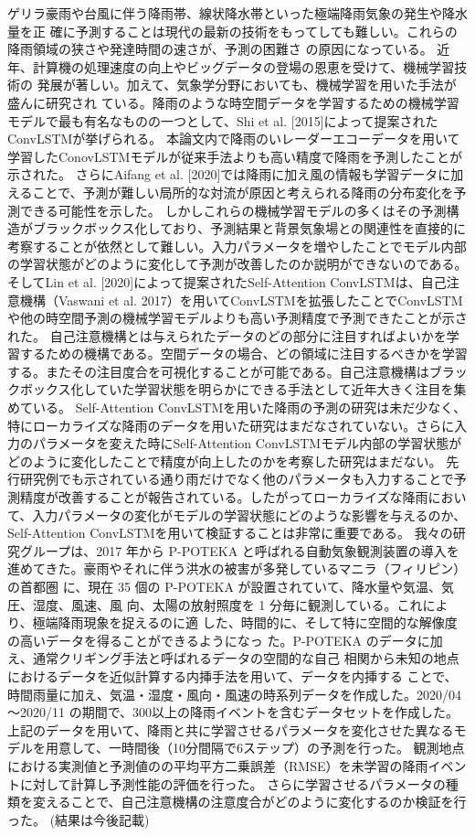 ゲリラ豪雨や台風に伴う降雨帯、線状降水帯といった極端降雨気象の発生や降水量を正
確に予測することは現代の最新の技術をもってしても難しい。これらの降雨領域の狭さや発達時間の速さが、予測の困難さ
の原因になっている。
近年、計算機の処理速度の向上やビッグデータの登場の恩恵を受けて、機械学習技術の
発展が著しい。加えて、気象学分野においても、機械学習を用いた手法が盛んに研究され
ている。降雨のような時空間データを学習するための機械学習モデルで最も有名なものの一つとして、Shi et al. [2015]によって提案されたConvLSTMが挙げられる。
本論文内で降雨のいレーダーエコーデータを用いて学習したConovLSTMモデルが従来手法よりも高い精度で降雨を予測したことが示された。
さらにAifang et al. [2020]では降雨に加え風の情報も学習データに加えることで、予測が難しい局所的な対流が原因と考えられる降雨の分布変化を予測できる可能性を示した。
しかしこれらの機械学習モデルの多くはその予測構造がブラックボックス化しており、予測結果と背景気象場との関連性を直接的に考察することが依然として難しい。入力パラメータを増やしたことでモデル内部の学習状態がどのように変化して予測が改善したのか説明ができないのである。
そしてLin et al. [2020]によって提案されたSelf-Attention ConvLSTMは、自己注意機構（Vaswani et al. 2017）を用いてConvLSTMを拡張したことでConvLSTMや他の時空間予測の機械学習モデルよりも高い予測精度で予測できたことが示された。
自己注意機構とは与えられたデータのどの部分に注目すればよいかを学習するための機構である。空間データの場合、どの領域に注目するべきかを学習する。またその注目度合を可視化することが可能である。自己注意機構はブラックボックス化していた学習状態を明らかにできる手法として近年大きく注目を集めている。
Self-Attention ConvLSTMを用いた降雨の予測の研究は未だ少なく、特にローカライズな降雨のデータを用いた研究はまだなされていない。さらに入力のパラメータを変えた時にSelf-Attention ConvLSTMモデル内部の学習状態がどのように変化したことで精度が向上したのかを考察した研究はまだない。
先行研究例でも示されている通り雨だけでなく他のパラメータも入力することで予測精度が改善することが報告されている。したがってローカライズな降雨において、入力パラメータの変化がモデルの学習状態にどのような影響を与えるのか、Self-Attention ConvLSTMを用いて検証することは非常に重要である。
我々の研究グループは、2017 年から P-POTEKA と呼ばれる自動気象観測装置の導入を
進めてきた。豪雨やそれに伴う洪水の被害が多発しているマニラ（フィリピン）の首都圏
に、現在 35 個の P-POTEKA が設置されていて、降水量や気温、気圧、湿度、風速、風
向、太陽の放射照度を 1 分毎に観測している。これにより、極端降雨現象を捉えるのに適
した、時間的に、そして特に空間的な解像度の高いデータを得ることができるようになっ
た。P-POTEKA のデータに加え、通常クリギング手法と呼ばれるデータの空間的な自己
相関から未知の地点におけるデータを近似計算する内挿手法を用いて、データを内挿する
ことで、時間雨量に加え、気温・湿度・風向・風速の時系列データを作成した。2020/04～2020/11 の期間で、300以上の降雨イベントを含むデータセットを作成した。
上記のデータを用いて、降雨と共に学習させるパラメータを変化させた異なるモデルを用意して、一時間後（10分間隔で6ステップ）の予測を行った。
観測地点における実測値と予測値のの平均平方二乗誤差（RMSE）を未学習の降雨イベントに対して計算し予測性能の評価を行った。
さらに学習させるパラメータの種類を変えることで、自己注意機構の注意度合がどのように変化するのか検証を行った。
(結果は今後記載)